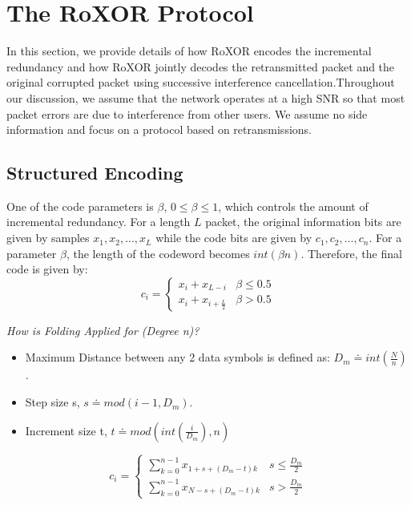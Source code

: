 \section{The RoXOR Protocol}
\label{sec:htproblem}
In this section, we provide details of how RoXOR encodes the incremental redundancy and how RoXOR jointly decodes the retransmitted packet and the original corrupted packet using successive interference cancellation.Throughout our discussion, we assume that the network operates at a high SNR so that most packet errors are due to interference from other users. We assume no side information and focus on a protocol based on retransmissions.

\subsection{Structured Encoding}
One of the code parameters is $\beta$, $0\leq\beta\leq1$, which controls the amount of incremental redundancy. For a length $L$ packet, the original information bits are given by samples $x_1,x_2,...,x_L$ while the code bits are given by $c_1,c_2,...,c_n$. For a parameter $\beta$, the length of the codeword becomes $int(\beta n)$. Therefore, the final code is given by:
\begin{equation}
c_i = 
\begin{cases}
x_{i} + x_{L-i} & \beta \leq 0.5 \\
x_{i} + x_{i+\frac{L}{2}} & \beta > 0.5
\end{cases}
\end{equation}

	
\emph{How is Folding Applied for (Degree n)?} 
\begin{itemize}
    \item Maximum Distance between any 2 data symbols is defined as: $D_{m}\doteq int(\frac{N}{n})$.
    \item Step size s, $s\doteq mod(i-1,D_m)$.
    \item Increment size t, $t\doteq mod(int(\frac{i}{D_m}),n)$
\end{itemize}

\begin{equation}
        c_i = \begin{cases}
                \sum_{k=0}^{n-1}x_{1+s+(D_m-t)k} & s \leq \frac{D_m}{2} \\
                \sum_{k=0}^{n-1}x_{N-s+(D_m-t)k} & s > \frac{D_m}{2}
        \end{cases}
\end{equation}

